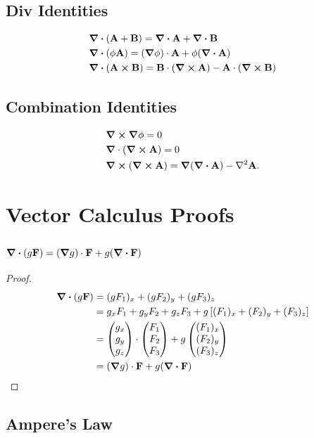\documentclass{book}
\begin{document}
\section{Div Identities}
\begin{align}
    & \div{(\vb{A}+\vb{B})} = \div{\vb{A}} + \div{\vb{B}} \\
    & \div{(\phi\vb{A})} = (\grad\phi)\cdot\vb{A} +\phi(\div{\vb{A}}) \\
    & \div{(\vb{A}\cross\vb{B})} = \vb{B}\cdot(\curl{\vb{A}})-\vb{A}\cdot(\curl{\vb{B}})
\end{align}
\section{Combination Identities}
\begin{align}
    & \grad \cross \grad\phi = 0 \\
    & \grad \cdot (\curl{\vb{A}}) = 0 \\
    & \curl{(\curl{\vb{A}})} = \grad(\div{\vb{A}}) - \nabla^2\vb{A}.
\end{align}
\chapter{Vector Calculus Proofs}
\section{$\div{(g\vb{F})} = (\grad g)\cdot \vb{F} + g(\div{\vb{F}})$}
\begin{proof}
    \begin{equation*}
        \begin{split}
            \div{(g\vb{F})} & = (gF_1)_x + (gF_2)_y + (gF_3)_z \\
            & = g_xF_1 + g_y F_2 + g_z F_3 + g\left[(F_1)_x + (F_2)_y + (F_3)_z\right] \\
            & = \begin{pmatrix}
                g_x \\ g_y \\ g_z
            \end{pmatrix} \cdot \begin{pmatrix}
                F_1 \\ F_2 \\ F_3
            \end{pmatrix} + g\begin{pmatrix}
                (F_1)_x \\ (F_2)_y \\ (F_3)_z 
            \end{pmatrix}\\
            & = (\grad g)\cdot \vb{F} + g(\div{\vb{F}})
        \end{split}
    \end{equation*}
\end{proof}
\section{Ampere's Law}
\end{document}
